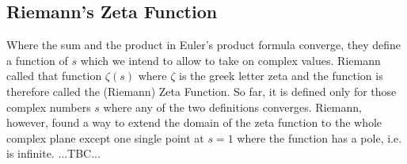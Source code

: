 \subsection{Riemann's Zeta Function}
Where the sum and the product in Euler's product formula converge, they define a function of $s$ which we intend to allow to take on complex values. Riemann called that function $\zeta(s)$ where $\zeta$ is the greek letter zeta and the function is therefore called the (Riemann) Zeta Function. So far, it is defined only for those complex numbers $s$ where any of the two definitions converges. Riemann, however, found a way to extend the domain of the zeta function to the whole complex plane except one single point at $s=1$ where the function has a pole, i.e. is infinite. ...TBC...












